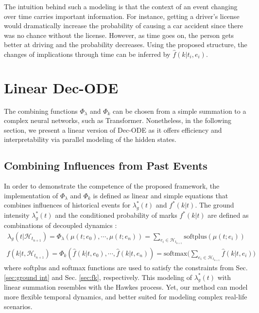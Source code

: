 The intuition behind such a modeling is that the context of an event changing over time carries important information. For instance, getting a driver's license would dramatically increase the probability of causing a car accident since there was no chance without the license. 
However, as time goes on, the person gets better at driving and the probability decreases. 
Using the proposed structure, the changes of implications through time can be inferred by $\hat{f}(k|t_i,e_i)$.

 
\section{Linear Dec-ODE \label{Linear Decode}}

The combining functions $\Phi_\lambda$ and $\Phi_k$ can be chosen from a simple summation to a complex neural networks, such as Transformer. 
Nonetheless, in the following section, we present 
a linear version of Dec-ODE as it offers efficiency and interpretability via parallel modeling of the hidden states. 


\subsection{Combining Influences from Past Events}
In order to demonstrate the competence of the proposed framework, the implementation of $\Phi_\lambda$ and $\Phi_k$ is defined as linear and simple equations that combines influences of historical events for $\lambda ^* _g(t)$ and $f^*(k|t)$. 
The ground intensity $\lambda^* _g (t)$ and the conditioned probability of marks $f^*(k|t)$ are defined as combinations of decoupled dynamics :
\begin{equation}
\begin{aligned}
\lambda _g (t| \mathcal{H}_{t_{n+1}}) = \Phi_\lambda(\mu(t;e_0), \cdots, \mu(t;e_n)) = \sum _{e_i \in \mathcal{H}_{t_{n+1}}} \text{softplus} (\mu  (t; e_i))
\end{aligned}
\label{eq: lin-ground}
\end{equation}
\begin{equation}
\begin{aligned}
f(k|t, \mathcal{H}_{t_{n+1}}) = \Phi _k( \hat{f}(k|t,e_0), \cdots, \hat{f}(k|t,e_n)) = \text{softmax} \bigg( \sum_{e_i \in \mathcal{H}_{t_{n+1}}} \hat{f}(k|t,e_i)\bigg)
\end{aligned}
\end{equation}
where softplus and softmax functions are used to satisfy the constraints from Sec. \ref{sec:ground int} and Sec. \ref{sec:fk}, respectively.
This modeling of $\lambda^*_g(t)$ with linear summation resembles with the Hawkes process. 
Yet, our method can model more flexible temporal dynamics, and better suited for modeling complex real-life scenarios. 
 
